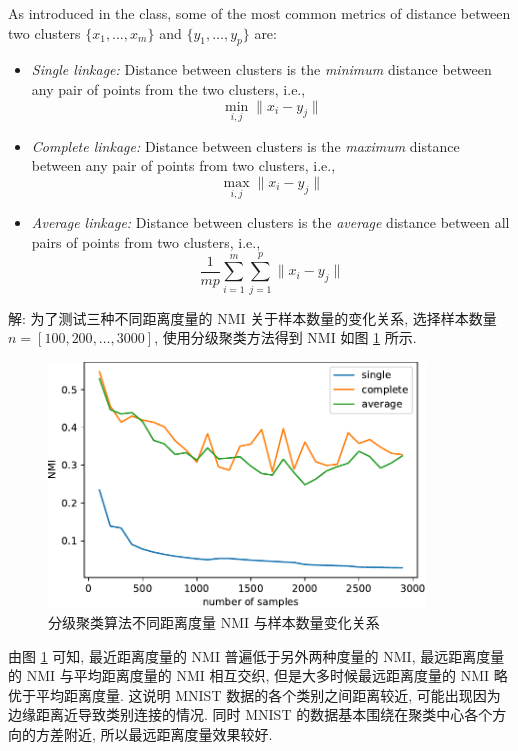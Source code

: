 \documentclass{article}
\begin{document}
As introduced in the class, some of the most common metrics of distance between two clusters $\{x_{1},\dots, x_{m}\}$ and $\{y_{1},\dots, y_{p}\}$ are:
\begin{itemize}
  \item \emph{Single linkage:} Distance between clusters is the \emph{minimum} distance between any pair of points from the two clusters, i.e.,
  \begin{equation}
    \min_{i, j}\|x_{i}-y_{j}\|
  \end{equation}

  \item \emph{Complete linkage:} Distance between clusters is the \emph{maximum} distance between any pair of points from two clusters, i.e.,
  \begin{equation}
    \max_{i, j}\|x_{i}-y_{j}\|
  \end{equation}

  \item \emph{Average linkage:} Distance between clusters is the \emph{average} distance between all pairs of points from two clusters, i.e.,
  \begin{equation}
    \frac{1}{mp}\sum_{i=1}^{m}\sum_{j=1}^{p}\|x_{i}-y_{j}\|
  \end{equation}
\end{itemize}

解: 为了测试三种不同距离度量的 NMI 关于样本数量的变化关系, 选择样本数量 $n=[100,200,\dots,3000]$, 使用分级聚类方法得到 NMI 如图 \ref{fig:hierarchical_nmi} 所示. 

\begin{figure}[htbp]
  \centering
  \includegraphics[width=10cm]{hierarchical_nmi.pdf}
  \caption{分级聚类算法不同距离度量 NMI 与样本数量变化关系}
  \label{fig:hierarchical_nmi}
\end{figure}

由图 \ref{fig:hierarchical_nmi} 可知, 最近距离度量的 NMI 普遍低于另外两种度量的 NMI, 最远距离度量的 NMI 与平均距离度量的 NMI 相互交织, 但是大多时候最远距离度量的 NMI 略优于平均距离度量. 这说明 MNIST 数据的各个类别之间距离较近, 可能出现因为边缘距离近导致类别连接的情况. 同时 MNIST 的数据基本围绕在聚类中心各个方向的方差附近, 所以最远距离度量效果较好.
\end{document}

